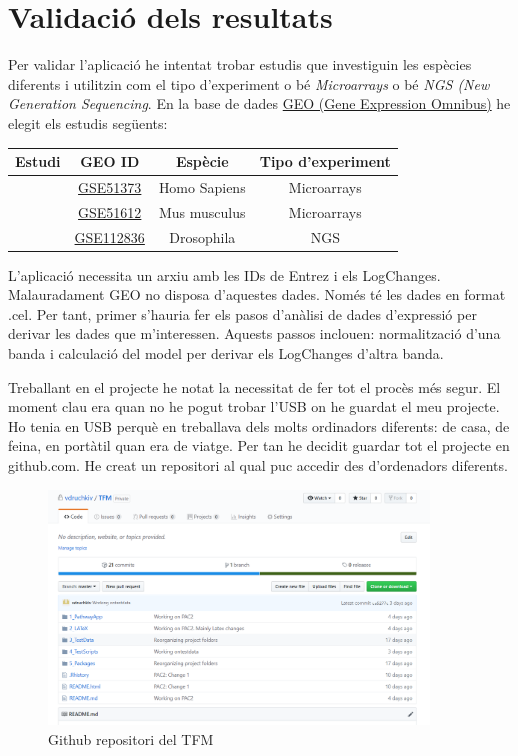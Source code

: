 \documentclass[]{article}
\begin{document}
\section{Validació dels resultats}

Per validar l'aplicació he intentat trobar estudis que investiguin les espècies diferents i utilitzin com el tipo d'experiment o bé \textit{Microarrays} o bé \textit{NGS (New Generation Sequencing}. En la base de dades \href{https://www.ncbi.nlm.nih.gov/geo/}{GEO (Gene Expression Omnibus)} he elegit els estudis següents:

\begin{center}
 \begin{tabular}{||c  | c | c | c ||} 
 \hline 
 Estudi & GEO ID & Espècie & Tipo d'experiment \\ [0.5ex] 
 \hline\hline
 \cite{koti2013identification}  & \href{https://www.ncbi.nlm.nih.gov/geo/query/acc.cgi?acc=GSE51373}{GSE51373}& Homo Sapiens  & Microarrays \\ 
 \hline
  \cite{sgado2013transcriptome}  & \href{https://www.ncbi.nlm.nih.gov/geo/query/acc.cgi?acc=GSE51612}{GSE51612}& Mus musculus  & Microarrays \\ 
  \hline
  \cite{graze2018perturbation}  & \href{https://www.ncbi.nlm.nih.gov/geo/query/acc.cgi?acc=GSE112836}{GSE112836}& Drosophila  & NGS \\ 
 \hline
\end{tabular}
\end{center}

L'aplicació necessita un arxiu amb les IDs de Entrez i els LogChanges. Malauradament GEO no disposa d'aquestes dades. Només té les dades en format .cel. Per tant, primer s'hauria fer els pasos d'anàlisi de dades d'expressió per derivar les dades que m'interessen. Aquests passos inclouen: normalització d'una banda i calculació del model per derivar els LogChanges d'altra banda.   

Treballant en el projecte he notat la necessitat de fer tot el procès més segur. El moment clau era quan no he pogut trobar l'USB on he guardat el meu projecte. Ho tenia en USB perquè en treballava dels molts ordinadors diferents: de casa, de feina, en portàtil quan era de viatge. Per tan he decidit guardar tot el projecte en github.com. He creat un repositori al qual puc accedir des d'ordenadors diferents.

\begin{figure}[H]
\centering
\includegraphics[width=0.9\textwidth]{GitHub.png} 
\caption{Github repositori del TFM}
\end{figure}



\end{document}
